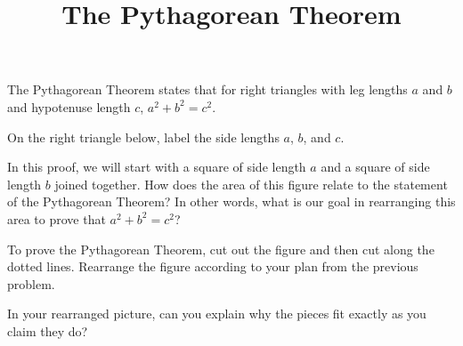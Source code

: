 \documentclass[nooutcomes,noauthor]{ximera}
\title{The Pythagorean Theorem}
\begin{document}
\begin{abstract}
\end{abstract}

\maketitle

The Pythagorean Theorem states that for right triangles with leg lengths $a$ and $b$ and hypotenuse length $c$, $a^2 + b^2 = c^2$.
\begin{problem}
On the right triangle below, label the side lengths $a$, $b$, and $c$.
\begin{image}
\end{image}
\end{problem} \vfill

\begin{problem}
In this proof, we will start with a square of side length $a$ and a square of side length $b$ joined together. How does the area of this figure relate to the statement of the Pythagorean Theorem? In other words, what is our goal in rearranging this area to prove that $a^2 + b^2 = c^2$?
\begin{image}
\end{image}
\end{problem} \vfill


\newpage
\begin{problem} 
To prove the Pythagorean Theorem, cut out the figure and then cut along the dotted lines. Rearrange the figure according to your plan from the previous problem.
\begin{image}
\end{image}
\end{problem}

\begin{problem}
In your rearranged picture, can you explain why the pieces fit exactly as you claim they do?
\end{problem}
\end{document}
